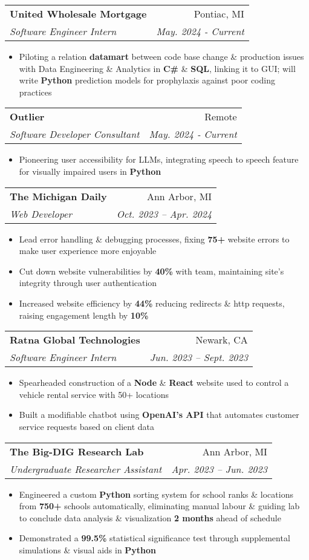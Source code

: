\documentclass[letterpaper,11pt]{article}
\makeatletter
\newcommand{\resumeItem}[1]{
  \item\small{
    {#1 \vspace{-2pt}}
  }
}
\newcommand{\resumeSubheading}[4]{
  \vspace{-2pt}\item
    \begin{tabular*}{0.97\textwidth}[t]{l@{\extracolsep{\fill}}r}
      \textbf{#1} & #2 \\
      \textit{\small#3} & \textit{\small #4} \\
    \end{tabular*}\vspace{-7pt}
}
\newcommand{\resumeItemListStart}{\begin{itemize}}
\newcommand{\resumeItemListEnd}{\end{itemize}\vspace{-5pt}}
\makeatother
\begin{document}
          \resumeSubheading
          {United Wholesale Mortgage}{Pontiac, MI}
          {Software Engineer Intern}{ May. 2024 - Current}
          \resumeItemListStart
            \resumeItem{Piloting a relation \textbf{datamart} between code 
base change 
            \& production issues with Data Engineering \& Analytics in 
\textbf{C\#} \& \textbf{SQL}, linking it to GUI; will write 
\textbf{Python} prediction models for prophylaxis against poor coding 
practices}
          \resumeItemListEnd
          
          \resumeSubheading
          {Outlier}{Remote}
          {Software Developer Consultant} {May. 2024 - Current}
           \resumeItemListStart
            \resumeItem{Pioneering user accessibility for LLMs, 
integrating speech to speech feature for visually impaired users in 
\textbf{Python}}
          \resumeItemListEnd
          \vspace{2pt}

          \resumeSubheading
          {The Michigan Daily}{Ann Arbor, MI}
          {Web Developer}{Oct. 2023 -- Apr. 2024}
          \resumeItemListStart
            \resumeItem{Lead error handling \& debugging processes, fixing 
\textbf{75+} website errors to make user experience more enjoyable}
            \resumeItem{Cut down website vulnerabilities by \textbf{40\%} 
with team, maintaining site's integrity through user authentication}
            \resumeItem{Increased website efficiency by \textbf{44\%} 
reducing redirects \& http requests, raising engagement length by 
\textbf{10\%}}
          \resumeItemListEnd

          \resumeSubheading
          {Ratna Global Technologies}{Newark, CA}
          {Software Engineer Intern}{Jun. 2023 -- Sept. 2023}
          \resumeItemListStart
            \resumeItem{Spearheaded construction of a \textbf{Node} \& 
\textbf{React} website used to control a vehicle rental service with 50+ 
locations}
            \resumeItem{Built a modifiable chatbot using \textbf{OpenAI’s 
API} that automates customer service requests based on client data}
          \resumeItemListEnd
 
          \resumeSubheading
          {The Big-DIG Research Lab}{Ann Arbor, MI}
          {Undergraduate Researcher Assistant}{Apr. 2023 -- Jun. 2023}
          \resumeItemListStart
            \resumeItem{Engineered a custom \textbf{Python} sorting system 
for school ranks \& locations from \textbf{750+} schools automatically, 
eliminating manual labour \& guiding lab to conclude data analysis \& 
visualization \textbf{2 months} ahead of schedule}
            \resumeItem{Demonstrated a \textbf{99.5\%} statistical 
significance test through supplemental simulations \& visual aids in 
\textbf{Python}}
          \resumeItemListEnd
\end{document}
